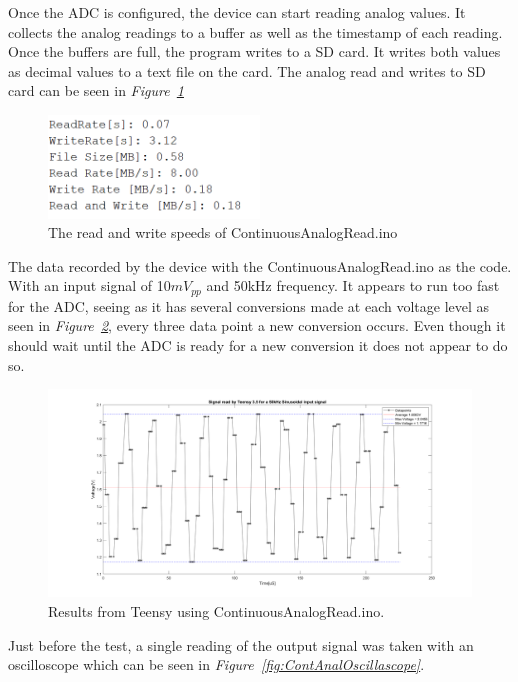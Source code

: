 Once the ADC is configured, the device can start reading analog values.
It collects the analog readings to a buffer as well as the timestamp of each reading.
Once the buffers are full, the program writes to a SD card.
It writes both values as decimal values to a text file on the card.
The analog read and writes to SD card can be seen in \textit{Figure~\ref{fig:ContAnalSpeed}}

\begin{figure}[h]
    \centering
    \includegraphics[width=0.50\textwidth]{graphics/ContinousReadSpeed.png}
    \caption{The read and write speeds of ContinuousAnalogRead.ino}
    \label{fig:ContAnalSpeed}
\end{figure}


The data recorded by the device with the ContinuousAnalogRead.ino as the code. 
With an input signal of 10$mV_{pp}$ and 50kHz frequency. 
It appears to run too fast for the ADC, seeing as it has several conversions made at each voltage level as seen in \textit{Figure~\ref{fig:ContAnalREsults}}, every three data point a new conversion occurs.
Even though it should wait until the ADC is ready for a new conversion it does not appear to do so.


\begin{figure}[h]
    \centering
    \includegraphics[width=1.0\textwidth]{graphics/COntANalogResults.png}
    \caption{Results from Teensy using ContinuousAnalogRead.ino.}
    \label{fig:ContAnalREsults}
\end{figure}

Just before the test, a single reading of the output signal was taken with an oscilloscope which can be seen in \textit{Figure~\ref{fig:ContAnalOscillascope}}.

